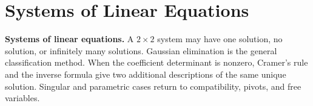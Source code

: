 \chapter{Systems of Linear Equations}








\noindent\textbf{Systems of linear equations.} A $2\times2$ system may have one solution, no solution, or infinitely many solutions. Gaussian elimination is the general classification method. When the coefficient determinant is nonzero, Cramer's rule and the inverse formula give two additional descriptions of the same unique solution. Singular and parametric cases return to compatibility, pivots, and free variables.


